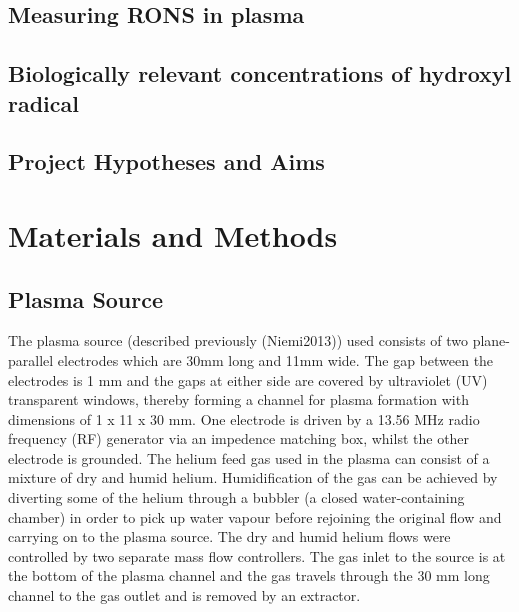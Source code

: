 \documentclass[11pt, oneside]{article}   	%
\begin{document}
\subsection{Measuring RONS in plasma}

\subsection{Biologically relevant concentrations of hydroxyl radical}

\subsection{Project Hypotheses and Aims}


\section{Materials and Methods}

\subsection{Plasma Source}
The plasma source (described previously (Niemi2013)) used consists of two plane-parallel electrodes which are 30mm long and 11mm wide. 
The gap between the electrodes is 1 mm and the gaps at either side are covered by ultraviolet (UV) transparent windows, thereby forming a channel for plasma formation with dimensions of 1 x 11 x 30 mm.
One electrode is driven by a 13.56 MHz radio frequency (RF) generator via an impedence matching box, whilst the other electrode is grounded. 
The helium feed gas used in the plasma can consist of a mixture of dry and humid helium. Humidification of the gas can be achieved by diverting some of the helium through a bubbler (a closed water-containing chamber) in order to pick up water vapour before rejoining the original flow and carrying on to the plasma source.
The dry and humid helium flows were controlled by two separate mass flow controllers.
The gas inlet to the source is at the bottom of the plasma channel and the gas travels through the 30 mm long channel to the gas outlet and is removed by an extractor.
\end{document}
